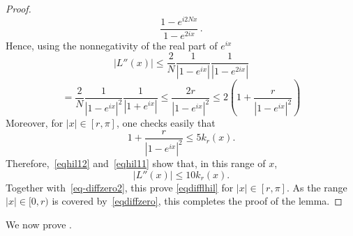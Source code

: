 \begin{proof}
\begin{equation}
     \frac{1-e^{i2Nx}}{1-e^{2ix}}\, .
\end{equation}
Hence, using the nonnegativity of the real part of $e^{ix}$
\begin{equation*}
    |L''(x)|
 \le \frac 2 N \frac {1}{|1-e^{ix}|}
     \frac{1}{|1-e^{2ix}|}
 \end{equation*}
\begin{equation}\label{eqhil11}
    = \frac 2 N \frac {1}{|1-e^{ix}|^2}
     \frac{1}{|1+e^{ix}|}\le
 \frac {2r}{|1-e^{ix}|^2}\le 2 \left(1+\frac {r}{|1-e^{ix}|^2}\right)
\end{equation}
Moreover, for $|x| \in [r, \pi]$, one checks easily that
\begin{equation*}
  1+\frac {r}{|1-e^{ix}|^2} \leq 5 k_r(x).
\end{equation*}
Therefore,~\eqref{eqhil12} and~\eqref{eqhil11} show that, in this range of $x$,
\begin{equation*}
  |L''(x)| \le 10 k_r(x).
\end{equation*}
Together with~\eqref{eq-diffzero2}, this prove \eqref{eqdifflhil} for $|x| \in [r, \pi]$.
As the range $|x| \in [0,r)$ is covered by~\eqref{eqdiffzero}, this completes the proof of the lemma.
\end{proof}


We now prove .

